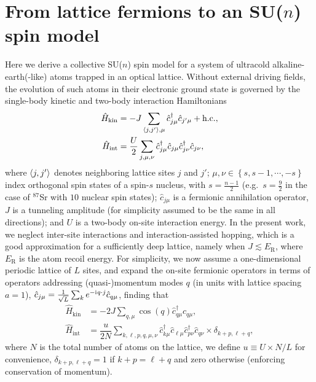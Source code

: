 \documentclass[aps,pra,nofootinbib,twocolumn,superscriptaddress]{revtex4-2}
\renewcommand{\t}{\text} %
\newcommand{\f}[2]{\dfrac{#1}{#2}} %
\newcommand{\p}[1]{\left(#1\right)} %
\renewcommand{\set}[1]{\left\{#1\right\}} %
\newcommand{\bk}{\braket} %
\renewcommand{\i}{\mathrm{i}\mkern1mu} %
\newcommand{\1}{\mathds{1}}
\renewcommand{\c}{\hat c}
\renewcommand{\H}{\hat H}
\begin{document}
\section{From lattice fermions to an SU($n$) spin model}
\label{sec:spin_model}

Here we derive a collective SU($n$) spin model for a system of ultracold alkaline-earth(-like) atoms trapped in an optical lattice.
Without external driving fields, the evolution of such atoms in their electronic ground state is governed by the single-body kinetic and two-body interaction Hamiltonians
\begin{align}
  \H_{\t{kin}}
  &= -J \sum_{\bk{j,j'},\mu} \c_{j\mu}^\dag \c_{j'\mu} + \t{h.c.}, \\
  \H_{\t{int}}
  &= \f{U}{2} \sum_{j,\mu,\nu}
  \c_{j\mu}^\dag \c_{j\mu} \c_{j\nu}^\dag \c_{j\nu},
\end{align}
where $\bk{j,j'}$ denotes neighboring lattice sites $j$ and $j'$; $\mu,\nu\in\set{s,s-1,\cdots,-s}$ index orthogonal spin states of a spin-$s$ nucleus, with $s=\frac{n-1}{2}$ (e.g.~$s=\frac{9}{2}$ in the case of ${}^{87}$Sr with $10$ nuclear spin states); $\c_{j\mu}$ is a fermionic annihilation operator, $J$ is a tunneling amplitude (for simplicity assumed to be the same in all directions); and $U$ is a two-body on-site interaction energy.
In the present work, we neglect inter-site interactions and interaction-assisted hopping, which is a good approximation for a sufficiently deep lattice, namely when $J\lesssim E_{\t{R}}$, where $E_{\t{R}}$ is the atom recoil energy.
For simplicity, we now assume a one-dimensional periodic lattice of $L$ sites, and expand the on-site fermionic operators in terms of operators addressing (quasi-)momentum modes $q$ (in units with lattice spacing $a=1$), $\c_{j\mu} = \frac1{\sqrt{L}} \sum_k e^{-\i q\cdot j} \c_{q\mu}$, finding that
\begin{align}
  \H_{\t{kin}}
  &= -2J\sum_{q,\mu} \cos\p{q} \c_{q\mu}^\dag \c_{q\mu}, \\
  \H_{\t{int}}
  &= \f{u}{2N} \sum_{k,\ell,p,q,\mu,\nu}
  \c_{k\mu}^\dag \c_{\ell\mu} \c_{p\nu}^\dag \c_{q\nu}
  \times \delta_{k+p,\ell+q},
  \label{eq:H_int_momenta}
\end{align}
where $N$ is the total number of atoms on the lattice, we define $u\equiv U\times N/L$ for convenience, $\delta_{k+p,\ell+q}=1$ if $k+p=\ell+q$ and zero otherwise (enforcing conservation of momentum).
\end{document}
